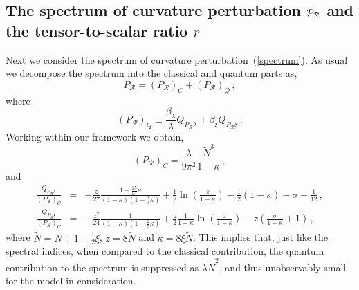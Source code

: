 \subsection{The spectrum of curvature perturbation ${\cal P}_{\cal R}$
          and the tensor-to-scalar ratio $r$}

 Next we consider the spectrum of curvature perturbation~(\ref{spectrum}).
As usual we decompose the spectrum into the classical and quantum parts as,
\begin{equation}
P_\mathcal{R} = \left(P_\mathcal{R}\right)_C +
\left(P_\mathcal{R}\right)_Q
\,,
\label{PR:+}
\end{equation}
where
\begin{equation}
\left(P_\mathcal{R}\right)_Q \equiv
\frac{\beta_\lambda}{\lambda}Q_{P_\mathcal{R}\lambda} + \beta_\xi
Q_{P_\mathcal{R}\xi}
\,.
\end{equation}
Working within our framework we obtain,
\begin{equation}
\left(P_\mathcal{R}\right)_C =
\frac{\lambda}{9\pi^2}\frac{\tilde{N}^3}{1-\kappa}\,,
\label{P_R:C}
\end{equation}
and
\begin{eqnarray}
\frac{Q_{P_\mathcal{R}\lambda}}{\left(P_\mathcal{R}\right)_C} &=&
- \frac{z}{27}\frac{1-\frac{25}{24}\kappa}{(1-\kappa)(1-\frac23\kappa)} +
\frac12\ln\left(\frac{z}{1-\kappa}\right) - \frac12(1-\kappa)
- \sigma - \frac1{12}
\nonumber\,,
\\
\frac{Q_{P_\mathcal{R}\xi}}{\left(P_\mathcal{R}\right)_C} &=&
-\frac{z^2}{24}\frac{1}{(1-\kappa)(1-\frac23\kappa)} +
\frac{z}{2}\frac{1}{1-\kappa}\ln\left(\frac{z}{1-\kappa}\right) -
z\left(\frac{\sigma}{1-\kappa}+1\right)
\,,
\label{PR:Q}
\end{eqnarray}
where $\tilde{N}=N+1-\frac12\xi$, $z=8\tilde N$ and
$\kappa = 8\xi\tilde N$. This implies that, just like the spectral indices,
when compared to the classical contribution, the quantum contribution
to the spectrum is suppressed as $\lambda \tilde N^2$, and thus
unobservably small for the model in consideration.

